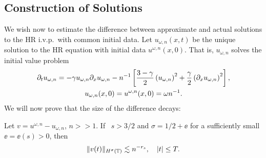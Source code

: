 \subsection{Construction of Solutions}
We wish now to estimate the difference between approximate and actual 
solutions to
the HR i.v.p.\ with common initial data. Let
$u_{\omega,n}(x,t)$ be the unique solution to the HR equation
with initial data $u^{\omega,n}(x,0)$. That is,
$u_{\omega,n}$ solves the initial value problem
\begin{gather*}
\partial_t u_{\omega,n} = - \gamma u_{\omega,n} \partial_x 
u_{\omega,n} - n^{-1} \left[
\frac{3- \gamma}{2}\left( u_{\omega,n} \right)^2 + 
\frac{\gamma}{2}\left(
\partial_x u_{\omega,n} \right)^2
\right], 
\\
u_{\omega,n}(x, 0) = u^{\omega,n}(x,0) = \omega n^{-1}.
\end{gather*}
%
%
%
We will now prove that the size of the difference decays: 
%
%
%
%
%
%
%
%
%
%
%
%
%
%
%
%
%
\begin{proposition}
\label{prop:bound_for_difference-of-approx-actual-soln}
Let $v=u^{\omega,n} - u_{\omega,n}$, $n >>1$.
If \ $s > 3/2 $ and $\sigma = 1/2 + \ee$ for a sufficiently
small $\ee = \ee(s) > 0$, then 
%
%
\begin{equation} \label{differ-Hsigma-est} \|
v(t)
\|_{H^\sigma(\mathbb{T})}
\lesssim n^{-r_s}, \quad |t| \le T.
\end{equation}
%
%
\end{proposition}
%
%
